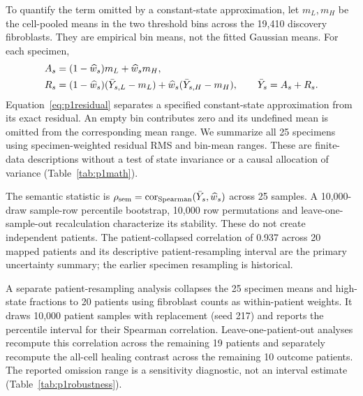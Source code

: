 \documentclass[10pt,a4paper]{article}
\begin{document}
To quantify the term omitted by a constant-state approximation, let $m_L,m_H$ be the cell-pooled means in the two threshold bins across the 19,410 discovery fibroblasts. They are empirical bin means, not the fitted Gaussian means. For each specimen,
\begin{align}
A_s&=(1-\widehat w_s)m_L+\widehat w_sm_H,\notag\\
R_s&=(1-\widehat w_s)(\bar Y_{s,L}-m_L)+\widehat w_s(\bar Y_{s,H}-m_H),\qquad \bar Y_s=A_s+R_s.\label{eq:p1residual}
\end{align}
Equation~\eqref{eq:p1residual} separates a specified constant-state approximation from its exact residual. An empty bin contributes zero and its undefined mean is omitted from the corresponding mean range. We summarize all 25 specimens using specimen-weighted residual RMS and bin-mean ranges. These are finite-data descriptions without a test of state invariance or a causal allocation of variance (Table~\ref{tab:p1math}).

The semantic statistic is $\rho_{\rm sem}=\operatorname{cor}_{\rm Spearman}(\bar Y_s,\widehat w_s)$ across 25 samples. A 10,000-draw sample-row percentile bootstrap, 10,000 row permutations and leave-one-sample-out recalculation characterize its stability. These do not create independent patients. The patient-collapsed correlation of 0.937 across 20 mapped patients and its descriptive patient-resampling interval are the primary uncertainty summary; the earlier specimen resampling is historical.

A separate patient-resampling analysis collapses the 25 specimen means and high-state fractions to 20 patients using fibroblast counts as within-patient weights. It draws 10,000 patient samples with replacement (seed 217) and reports the percentile interval for their Spearman correlation. Leave-one-patient-out analyses recompute this correlation across the remaining 19 patients and separately recompute the all-cell healing contrast across the remaining 10 outcome patients. The reported omission range is a sensitivity diagnostic, not an interval estimate (Table~\ref{tab:p1robustness}).
\end{document}
